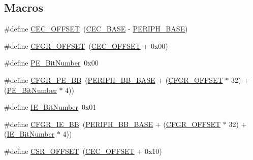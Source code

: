 \subsection*{Macros}
\begin{DoxyCompactItemize}
\item 
\#define \hyperlink{group___c_e_c___private___defines_ga675324bd8967b75f32554f50210821af}{C\+E\+C\+\_\+\+O\+F\+F\+S\+ET}~(\hyperlink{group___peripheral__memory__map_gaacb77bc44b3f8c87ab98f241e760e440}{C\+E\+C\+\_\+\+B\+A\+SE} -\/ \hyperlink{group___peripheral__memory__map_ga9171f49478fa86d932f89e78e73b88b0}{P\+E\+R\+I\+P\+H\+\_\+\+B\+A\+SE})
\item 
\#define \hyperlink{group___c_e_c___private___defines_ga8682298330c3b9bae1992e4f1a0af985}{C\+F\+G\+R\+\_\+\+O\+F\+F\+S\+ET}~(\hyperlink{group___c_e_c___private___defines_ga675324bd8967b75f32554f50210821af}{C\+E\+C\+\_\+\+O\+F\+F\+S\+ET} + 0x00)
\item 
\#define \hyperlink{group___c_e_c___private___defines_ga321e547b9574b065127c882e09a4f7e7}{P\+E\+\_\+\+Bit\+Number}~0x00
\item 
\#define \hyperlink{group___c_e_c___private___defines_ga9d1f044508cda5ad8213bd7bc5c4363d}{C\+F\+G\+R\+\_\+\+P\+E\+\_\+\+BB}~(\hyperlink{group___peripheral__memory__map_gaed7efc100877000845c236ccdc9e144a}{P\+E\+R\+I\+P\+H\+\_\+\+B\+B\+\_\+\+B\+A\+SE} + (\hyperlink{group___r_c_c___private___defines_ga8682298330c3b9bae1992e4f1a0af985}{C\+F\+G\+R\+\_\+\+O\+F\+F\+S\+ET} $\ast$ 32) + (\hyperlink{group___c_e_c___private___defines_ga321e547b9574b065127c882e09a4f7e7}{P\+E\+\_\+\+Bit\+Number} $\ast$ 4))
\item 
\#define \hyperlink{group___c_e_c___private___defines_ga57731312db52f3498312a56e98166fad}{I\+E\+\_\+\+Bit\+Number}~0x01
\item 
\#define \hyperlink{group___c_e_c___private___defines_gac7fe35cf912353ca51a56c5f1f25b2fb}{C\+F\+G\+R\+\_\+\+I\+E\+\_\+\+BB}~(\hyperlink{group___peripheral__memory__map_gaed7efc100877000845c236ccdc9e144a}{P\+E\+R\+I\+P\+H\+\_\+\+B\+B\+\_\+\+B\+A\+SE} + (\hyperlink{group___r_c_c___private___defines_ga8682298330c3b9bae1992e4f1a0af985}{C\+F\+G\+R\+\_\+\+O\+F\+F\+S\+ET} $\ast$ 32) + (\hyperlink{group___c_e_c___private___defines_ga57731312db52f3498312a56e98166fad}{I\+E\+\_\+\+Bit\+Number} $\ast$ 4))
\item 
\#define \hyperlink{group___c_e_c___private___defines_ga984cbe73312b6d3d355c5053763d499a}{C\+S\+R\+\_\+\+O\+F\+F\+S\+ET}~(\hyperlink{group___c_e_c___private___defines_ga675324bd8967b75f32554f50210821af}{C\+E\+C\+\_\+\+O\+F\+F\+S\+ET} + 0x10)

\end{DoxyCompactItemize}
